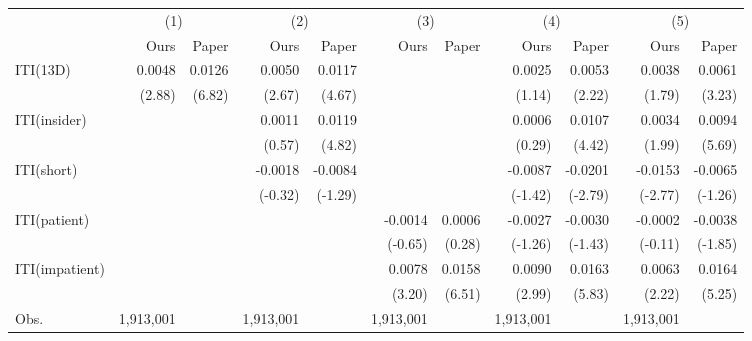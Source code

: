 \begin{tabular}{lrrrrrrrrrr}
\toprule
 & \multicolumn{2}{c}{(1)} & \multicolumn{2}{c}{(2)} & \multicolumn{2}{c}{(3)} & \multicolumn{2}{c}{(4)} & \multicolumn{2}{c}{(5)} \\
 & Ours & Paper & Ours & Paper & Ours & Paper & Ours & Paper & Ours & Paper \\
\midrule
ITI(13D) & 0.0048 & 0.0126 & 0.0050 & 0.0117 &  &  & 0.0025 & 0.0053 & 0.0038 & 0.0061 \\
 & (2.88) & (6.82) & (2.67) & (4.67) &  &  & (1.14) & (2.22) & (1.79) & (3.23) \\
ITI(insider) &  &  & 0.0011 & 0.0119 &  &  & 0.0006 & 0.0107 & 0.0034 & 0.0094 \\
 &  &  & (0.57) & (4.82) &  &  & (0.29) & (4.42) & (1.99) & (5.69) \\
ITI(short) &  &  & -0.0018 & -0.0084 &  &  & -0.0087 & -0.0201 & -0.0153 & -0.0065 \\
 &  &  & (-0.32) & (-1.29) &  &  & (-1.42) & (-2.79) & (-2.77) & (-1.26) \\
ITI(patient) &  &  &  &  & -0.0014 & 0.0006 & -0.0027 & -0.0030 & -0.0002 & -0.0038 \\
 &  &  &  &  & (-0.65) & (0.28) & (-1.26) & (-1.43) & (-0.11) & (-1.85) \\
ITI(impatient) &  &  &  &  & 0.0078 & 0.0158 & 0.0090 & 0.0163 & 0.0063 & 0.0164 \\
 &  &  &  &  & (3.20) & (6.51) & (2.99) & (5.83) & (2.22) & (5.25) \\
\midrule
Obs. & 1,913,001 &  & 1,913,001 &  & 1,913,001 &  & 1,913,001 &  & 1,913,001 &  \\
\bottomrule
\end{tabular}
